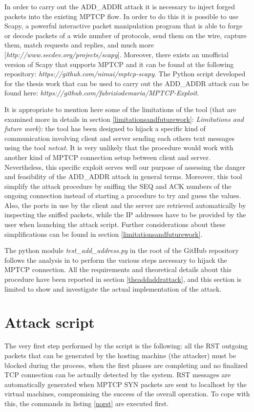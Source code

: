 In order to carry out the ADD\_ADDR attack it is necessary to inject forged packets into the existing MPTCP flow. In order to do this it is possible to use Scapy, a powerful interactive packet manipulation program that is able to forge or decode packets of a wide number of protocols, send them on the wire, capture them, match requests and replies, and much more [\textit{http://www.secdev.org/projects/scapy}]. Moreover, there exists an unofficial version of Scapy that supports MPTCP and it can be found at the following repository: \textit{https://github.com/nimai/mptcp-scapy}. The Python script developed for the thesis work that can be used to carry out the ADD\_ADDR attack can be found here: \textit{https://github.com/fabriziodemaria/MPTCP-Exploit}. 

It is appropriate to mention here some of the limitations of the tool (that are examined more in details in section \ref{limitationsandfuturework}: \textit{Limitations and future work}): the tool has been designed to hijack a specific kind of communication involving client and server sending each others text messages using the tool \textit{netcat}. It is very unlikely that the procedure would work with another kind of MPTCP connection setup between client and server. Nevertheless, this specific exploit serves well our purpose of assessing the danger and feasibility of the ADD\_ADDR attack in general terms.
Moreover, this tool simplify the attack procedure by sniffing the SEQ and ACK numbers of the ongoing connection instead of starting a procedure to try and guess the values. Also, the ports in use by the client and the server are retrieved automatically by inspecting the sniffed packets, while the IP addresses have to be provided by the user when launching the attack script. Further considerations about these simplifications can be found in section \ref{limitationsandfuturework}.

The python module \textit{test\_add\_address.py} in the root of the GitHub repository follows the analysis in  to perform the various steps necessary to hijack the MPTCP connection. All the requirements and theoretical details about this procedure have been reported in section \ref{theaddaddrattack}, and this section is limited to show and investigate the actual implementation of the attack.

\section{Attack script}
The very first step performed by the script is the following: all the RST outgoing packets that can be generated by the hosting machine (the attacker) must be blocked during the process, when the first phases are completing and no finalized TCP connection can be actually detected by the system. RST messages are automatically generated when MPTCP SYN packets are sent to localhost by the virtual machines, compromising the success of the overall operation.
To cope with this, the commands in listing \ref{norst} are executed first.


